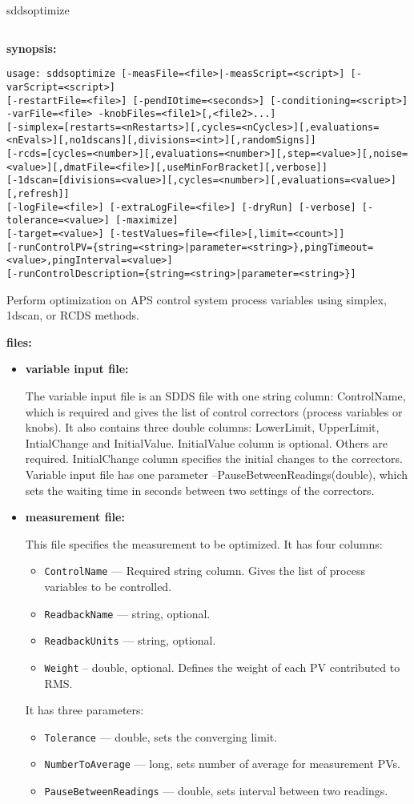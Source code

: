 \begin{sddsprog}{sddsoptimize}
\begin{verbatim}
\end{verbatim}

\item \textbf{synopsis:}
\begin{verbatim}
usage: sddsoptimize [-measFile=<file>|-measScript=<script>] [-varScript=<script>]
[-restartFile=<file>] [-pendIOtime=<seconds>] [-conditioning=<script>]
-varFile=<file> -knobFiles=<file1>[,<file2>...]
[-simplex=[restarts=<nRestarts>][,cycles=<nCycles>][,evaluations=<nEvals>][,no1dscans][,divisions=<int>][,randomSigns]]
[-rcds=[cycles=<number>][,evaluations=<number>][,step=<value>][,noise=<value>][,dmatFile=<file>][,useMinForBracket][,verbose]]
[-1dscan=[divisions=<value>][,cycles=<number>][,evaluations=<value>][,refresh]]
[-logFile=<file>] [-extraLogFile=<file>] [-dryRun] [-verbose] [-tolerance=<value>] [-maximize]
[-target=<value>] [-testValues=file=<file>[,limit=<count>]]
[-runControlPV={string=<string>|parameter=<string>},pingTimeout=<value>,pingInterval=<value>]
[-runControlDescription={string=<string>|parameter=<string>}]
\end{verbatim}
Perform optimization on APS control system process variables using simplex, 1dscan, or RCDS methods.
\item \textbf{files:}
\begin{itemize}
  \item \textbf{variable input file:} \par
The variable input file is an SDDS file with one string column: ControlName, which is required
and gives the list of control correctors (process variables or knobs). It also contains three
double columns: LowerLimit, UpperLimit, IntialChange and InitialValue. InitialValue column
is optional. Others are required. InitialChange column specifies the initial changes to the correctors.
Variable input file has one parameter --PauseBetweenReadings(double), which sets the waiting time in
seconds between two settings of the correctors.
  \item \textbf{measurement file:} \par This file specifies the measurement to be optimized.
It has four columns:
  \begin{itemize}
    \item {\tt ControlName} --- Required string column. Gives the list of process variables
                 to be controlled.
    \item {\tt ReadbackName} --- string, optional.
    \item {\tt ReadbackUnits} --- string, optional.
    \item {\tt Weight} -- double, optional. Defines the weight of each PV contributed to RMS.
  \end{itemize}
It has three parameters:
  \begin{itemize}
    \item {\tt Tolerance} --- double, sets the converging limit.
    \item {\tt NumberToAverage} --- long, sets number of average for measurement PVs.
    \item {\tt PauseBetweenReadings} --- double, sets interval between two readings.


\end{itemize}
\end{itemize}
\end{sddsprog}
